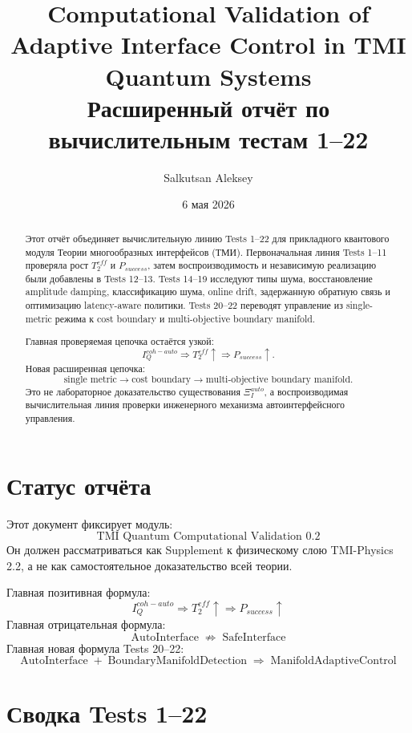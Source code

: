 \documentclass[12pt,a4paper]{article}
\title{\textbf{Computational Validation of Adaptive Interface Control in TMI Quantum Systems}\\
\large Расширенный отчёт по вычислительным тестам 1--22}
\author{Salkutsan Aleksey}
\date{6 мая 2026}
\begin{document}
\maketitle

\begin{abstract}
Этот отчёт объединяет вычислительную линию Tests 1--22 для прикладного квантового модуля Теории многообразных интерфейсов (ТМИ). Первоначальная линия Tests 1--11 проверяла рост $T_2^{eff}$ и $P_{success}$, затем воспроизводимость и независимую реализацию были добавлены в Tests 12--13. Tests 14--19 исследуют типы шума, восстановление amplitude damping, классификацию шума, online drift, задержанную обратную связь и оптимизацию latency-aware политики. Tests 20--22 переводят управление из single-metric режима к cost boundary и multi-objective boundary manifold.

Главная проверяемая цепочка остаётся узкой:
\[
I_Q^{coh-auto}\Rightarrow T_2^{eff}\uparrow\Rightarrow P_{success}\uparrow.
\]
Новая расширенная цепочка:
\[
\text{single metric}\to\text{cost boundary}\to\text{multi-objective boundary manifold}.
\]
Это не лабораторное доказательство существования $\Xi_I^{auto}$, а воспроизводимая вычислительная линия проверки инженерного механизма автоинтерфейсного управления.
\end{abstract}

\tableofcontents
\newpage

\section{Статус отчёта}

Этот документ фиксирует модуль:
\[
\boxed{\text{TMI Quantum Computational Validation 0.2}}
\]
Он должен рассматриваться как Supplement к физическому слою TMI-Physics 2.2, а не как самостоятельное доказательство всей теории.

Главная позитивная формула:
\[
\boxed{I_Q^{coh-auto}\Rightarrow T_2^{eff}\uparrow\Rightarrow P_{success}\uparrow}
\]
Главная отрицательная формула:
\[
\boxed{\operatorname{AutoInterface}\not\Rightarrow\operatorname{SafeInterface}}
\]
Главная новая формула Tests 20--22:
\[
\boxed{\operatorname{AutoInterface}+\operatorname{BoundaryManifoldDetection}\Rightarrow\operatorname{ManifoldAdaptiveControl}}
\]

\section{Сводка Tests 1--22}
\end{document}
